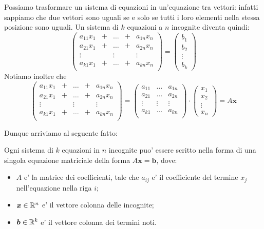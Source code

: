 Possiamo trasformare un sistema di equazioni in un'equazione tra vettori: infatti sappiamo che due vettori sono uguali se e solo se tutti i loro elementi nella stessa posizione sono uguali. Un sistema di $k$ equazioni a $n$ incognite diventa quindi:
\begin{equation*}
    \begin{pmatrix}
        a_{11}x_1 & + & \dots & + & a_{1n}x_n \\
        a_{21}x_1 & + & \dots & + & a_{2n}x_n \\
        \vdots    &   & \vdots &  & \vdots\\
        a_{k1}x_1 & + & \dots & + & a_{kn}x_n \\
    \end{pmatrix} = \begin{pmatrix}
        b_1 \\ b_2 \\ \vdots \\ b_k
    \end{pmatrix}
\end{equation*}
Notiamo inoltre che 
\begin{equation*}
    \begin{pmatrix}
        a_{11}x_1 & + & \dots & + & a_{1n}x_n \\
        a_{21}x_1 & + & \dots & + & a_{2n}x_n \\
        \vdots    &   & \vdots &  & \vdots\\
        a_{k1}x_1 & + & \dots & + & a_{kn}x_n \\
    \end{pmatrix} = \begin{pmatrix}
        a_{11} & \dots & a_{1n} \\
        a_{21} & \dots & a_{2n} \\
        \vdots & \vdots& \vdots \\
        a_{k1} & \dots & a_{kn} \\
    \end{pmatrix} \cdot \begin{pmatrix} x_1 \\ x_2 \\ \vdots \\ x_n \end{pmatrix}
    = A\bm{x}
\end{equation*}

Dunque arriviamo al seguente fatto:
\begin{proposition}
    Ogni sistema di $k$ equazioni in $n$ incognite puo' essere scritto nella forma di una singola equazione matriciale della forma $A\bm{x} = \bm{b}$, dove:
    \begin{itemize}
        \item $A$ e' la matrice dei coefficienti, tale che $a_{ij}$ e' il coefficiente del termine $x_j$ nell'equazione nella riga $i$;
        \item $\bm{x} \in \mathbb{R}^n$ e' il vettore colonna delle incognite;
        \item $\bm{b} \in \mathbb{R}^k$ e' il vettore colonna dei termini noti.
    \end{itemize}
\end{proposition}
    
